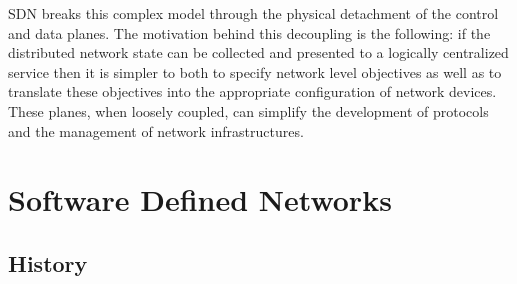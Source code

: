 \documentclass[12pt,openright,twoside]{report}
\begin{document}
SDN breaks this complex model through the physical detachment of the control and data planes.  
The motivation behind this decoupling is the following: if the distributed network state can be collected and presented to a logically centralized service then it is simpler to both to specify network level objectives as well as to translate these objectives into the appropriate configuration of network devices. 
These planes, when loosely coupled, can simplify the development of protocols and the management of network infrastructures. 


\section{Software Defined Networks}
\glsresetall
\label{sec:background:sdn}


\subsection{History}
\end{document}
